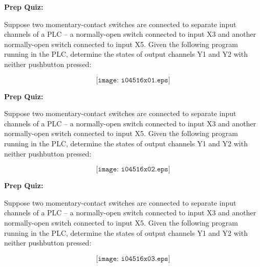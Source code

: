 \vfil \eject

\noindent
{\bf Prep Quiz:}

Suppose two momentary-contact switches are connected to separate input channels of a PLC -- a normally-open switch connected to input X3 and another normally-open switch connected to input X5.  Given the following program running in the PLC, determine the states of output channels Y1 and Y2 with neither pushbutton pressed:

$$\texttt{[image: i04516x01.eps]}$$

\vfil \eject

\noindent
{\bf Prep Quiz:}

Suppose two momentary-contact switches are connected to separate input channels of a PLC -- a normally-open switch connected to input X3 and another normally-open switch connected to input X5.  Given the following program running in the PLC, determine the states of output channels Y1 and Y2 with neither pushbutton pressed:

$$\texttt{[image: i04516x02.eps]}$$

\vfil \eject

\noindent
{\bf Prep Quiz:}

Suppose two momentary-contact switches are connected to separate input channels of a PLC -- a normally-open switch connected to input X3 and another normally-open switch connected to input X5.  Given the following program running in the PLC, determine the states of output channels Y1 and Y2 with neither pushbutton pressed:

$$\texttt{[image: i04516x03.eps]}$$




